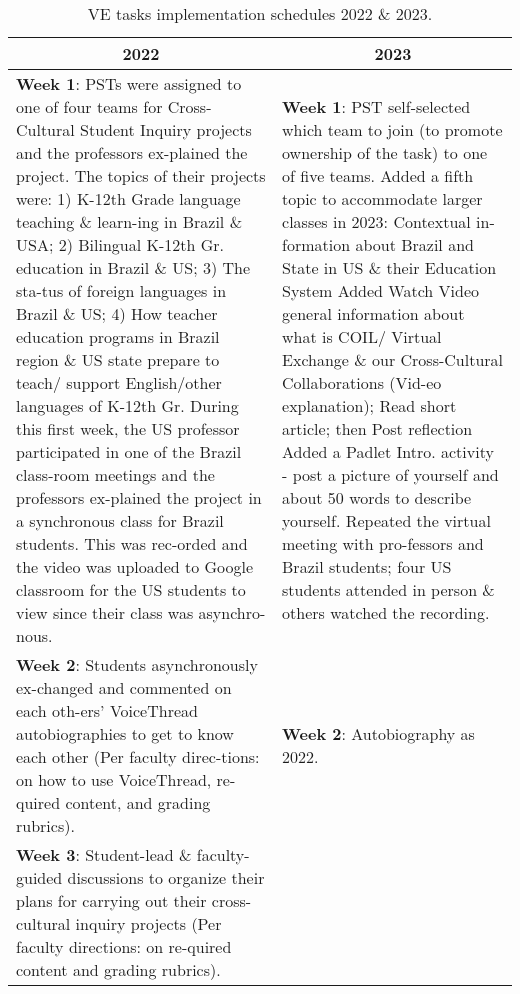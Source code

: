 \begin{table}[htpb]
\centering 
\begin{threeparttable}
\caption{VE tasks implementation schedules 2022 \& 2023.}
\label{tab-02}
\small
\setlength{\tabcolsep}{3pt}
\begin{tabular}{*{2}{p{}}}
\toprule
\multicolumn{1}{c}{2022} & \multicolumn{1}{c}{2023}\\
\midrule
\textbf{Week 1}: PSTs were assigned to one of four teams for Cross-Cultural Student Inquiry projects and the professors ex-plained the project.
The topics of their projects were: 1) K-12th Grade language teaching \& learn-ing in Brazil \& USA; 2) Bilingual K-12th Gr. education in Brazil \& US; 3) The sta-tus of foreign languages in Brazil \& US; 4) How teacher education programs in Brazil region \& US state prepare to teach/ support English/other languages of K-12th Gr.
During this first week, the US professor participated in one of the Brazil class-room meetings and the professors ex-plained the project in a synchronous class for Brazil students. This was rec-orded and the video was uploaded to Google classroom for the US students to view since their class was asynchro-nous. &
									
\textbf{Week 1}: PST self-selected which team to join (to promote ownership of the task) to one of five teams.
Added a fifth topic to accommodate larger classes in 2023:  Contextual in-formation about Brazil and State in US \& their Education System
Added Watch Video general information about what is COIL/ Virtual Exchange \& our Cross-Cultural Collaborations (Vid-eo explanation); Read short article; then Post reflection
Added a Padlet Intro. activity - post a picture of yourself and about 50 words to describe yourself.
Repeated the virtual meeting with pro-fessors and Brazil students; four US students attended in person \& others watched the recording. \\
					
\textbf{Week 2}: Students asynchronously ex-changed and commented on each oth-ers’ VoiceThread autobiographies to get to know each other (Per faculty direc-tions: on how to use VoiceThread, re-quired content, and grading rubrics). &
			
\textbf{Week 2}: Autobiography as 2022. \\
				
\textbf{Week 3}: Student-lead \& faculty-guided discussions to organize their plans for carrying out their cross-cultural inquiry projects (Per faculty directions: on re-quired content and grading rubrics). &
					

\end{tabular}
\end{threeparttable}
\end{table}
